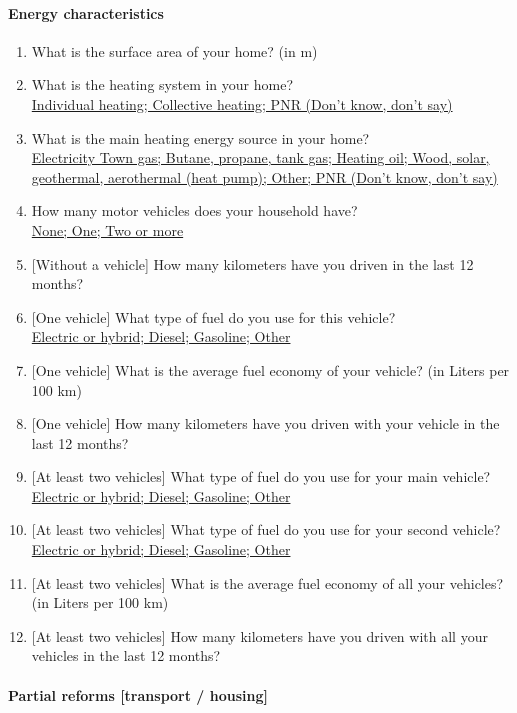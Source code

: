 \documentclass[english,5p,authoryear]{elsarticle}
\begin{document}
\begin{appendices}
\paragraph{Energy characteristics}
\begin{enumerate}[resume,leftmargin=*]
\item What is the surface area of your home? (in m\texttwosuperior )
\item What is the heating system in your home? \uline{}\\
\uline{Individual heating; Collective heating; PNR (Don't know, don't
say)}
\item What is the main heating energy source in your home? \uline{}\\
\uline{Electricity Town gas; Butane, propane, tank gas; Heating oil;
Wood, solar, geothermal, aerothermal (heat pump); Other; PNR (Don't
know, don't say)}
\item How many motor vehicles does your household have? \uline{}\\
\uline{None; One; Two or more} 
\item {[}Without a vehicle{]} How many kilometers have you driven in the
last 12 months? 
\item {[}One vehicle{]} What type of fuel do you use for this vehicle? \uline{}\\
\uline{Electric or hybrid; Diesel; Gasoline; Other} 
\item {[}One vehicle{]} What is the average fuel economy of your vehicle?
(in Liters per 100 km)
\item {[}One vehicle{]} How many kilometers have you driven with your vehicle
in the last 12 months?
\item {[}At least two vehicles{]} What type of fuel do you use for your
main vehicle?\\
 \uline{Electric or hybrid; Diesel; Gasoline; Other} 
\item {[}At least two vehicles{]} What type of fuel do you use for your
second vehicle?\\
 \uline{Electric or hybrid; Diesel; Gasoline; Other} 
\item {[}At least two vehicles{]} What is the average fuel economy of all
your vehicles? (in Liters per 100 km) 
\item {[}At least two vehicles{]} How many kilometers have you driven with
all your vehicles in the last 12 months? 
\end{enumerate}

\paragraph{Partial reforms {[}transport / housing{]}}


\end{appendices}
\end{document}
